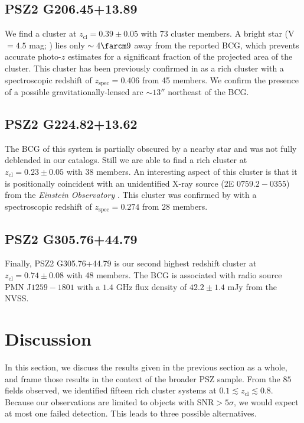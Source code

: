 \documentclass[apj, revtex4-1]{emulateapj}
\begin{document}
\subsection{PSZ2 G206.45+13.89} %
We find a cluster at $z_\mathrm{cl} = 0.39 \pm 0.05$ with 73 cluster members. A bright star (V $= 4.5$ mag; \citealt{Hog2000}) lies only $\sim4\farcm9$ away from the reported BCG, which prevents accurate photo-$z$ estimates for a significant fraction of the projected area of the cluster. This cluster has been previously confirmed in \citet{Barrena2018} as a rich cluster with a spectroscopic redshift of $z_\mathrm{spec} = 0.406$ from 45 members. We confirm the presence of a possible gravitationally-lensed arc $\sim13''$ northeast of the BCG.

\subsection{PSZ2 G224.82+13.62} %
The BCG of this system is partially obscured by a nearby star and was not fully deblended in our catalogs. Still we are able to find a rich cluster at $z_\mathrm{cl} = 0.23 \pm 0.05$ with 38 members. An interesting aspect of this cluster is that it is positionally coincident with an unidentified X-ray source (2E $0759.2-0355$) from the \textit{Einstein Observatory} \citep{Harris1990}. This cluster was confirmed by \cite{Barrena2018} with a spectroscopic redshift of $z_\mathrm{spec} = 0.274$ from 28 members.

\subsection{PSZ2 G305.76+44.79} %
Finally, PSZ2 G305.76+44.79 is our second highest redshift cluster at $z_\mathrm{cl} = 0.74 \pm 0.08$ with 48 members. The BCG is associated with radio source PMN J$1259-1801$ with a $1.4$ GHz flux density of $42.2\pm 1.4$ mJy from the NVSS.


\section{Discussion}\label{sec:discussion}
In this section, we discuss the results given in the previous section as a whole, and frame those results in the context of the broader PSZ sample. From the $85$ fields observed, we identified fifteen rich cluster systems at $0.1\lesssim z_\mathrm{cl} \lesssim 0.8$. Because our observations are limited to objects with SNR$>5\sigma$, we would expect at most one failed detection. This leads to three possible alternatives.
\end{document}
